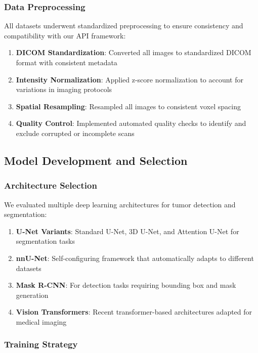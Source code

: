 \documentclass[12pt,a4paper]{article}
\begin{document}
\subsubsection{Data Preprocessing}

All datasets underwent standardized preprocessing to ensure consistency and compatibility with our API framework:

\begin{enumerate}
    \item \textbf{DICOM Standardization}: Converted all images to standardized DICOM format with consistent metadata
    \item \textbf{Intensity Normalization}: Applied z-score normalization to account for variations in imaging protocols
    \item \textbf{Spatial Resampling}: Resampled all images to consistent voxel spacing
    \item \textbf{Quality Control}: Implemented automated quality checks to identify and exclude corrupted or incomplete scans
\end{enumerate}

\subsection{Model Development and Selection}

\subsubsection{Architecture Selection}

We evaluated multiple deep learning architectures for tumor detection and segmentation:

\begin{enumerate}
    \item \textbf{U-Net Variants}: Standard U-Net, 3D U-Net, and Attention U-Net for segmentation tasks
    \item \textbf{nnU-Net}: Self-configuring framework that automatically adapts to different datasets \cite{isensee2021nnunet}
    \item \textbf{Mask R-CNN}: For detection tasks requiring bounding box and mask generation
    \item \textbf{Vision Transformers}: Recent transformer-based architectures adapted for medical imaging
\end{enumerate}

\subsubsection{Training Strategy}
\end{document}
